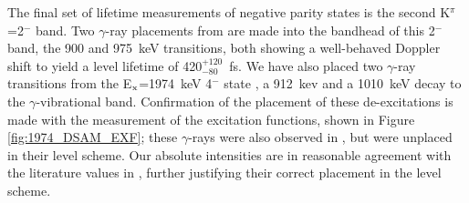 The final set of lifetime measurements of negative parity states is the second K$^\pi$=2$^-$ band. Two $\gamma$-ray placements from \cite{Aprahamian200642} are made into the bandhead of this 2$^-$ band, the 900 and 975~keV transitions, both showing a well-behaved Doppler shift to yield a level lifetime of 420$^{+120}_{-80}$~fs.  We have also placed two $\gamma$-ray transitions from the E$_{\rm x}$=1974~keV 4$^-$ state \cite{BERZINS1995413}, a 912~kev and a 1010~keV decay to the $\gamma$-vibrational band. Confirmation of the placement of these de-excitations is made with the measurement of the excitation functions, shown in Figure \ref{fig:1974_DSAM_EXF}; these $\gamma$-rays were also observed in \cite{Aprahamian200642}, but were unplaced in their level scheme. Our absolute intensities are in reasonable agreement with the literature values in \cite{Aprahamian200642,BERZINS1995413}, further justifying their correct placement in the level scheme. 


